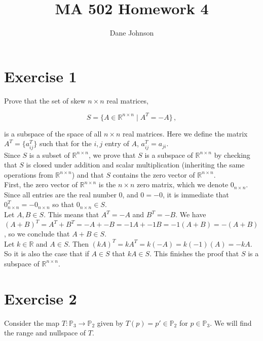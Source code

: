 \documentclass[11pt]{article}
\title{MA 502 Homework 4}
\author{Dane Johnson}
\begin{document}
\maketitle

\section*{Exercise 1}

Prove that the set of skew $n\times n$ real matrices,

$$S = \{A \in \mathbb{R}^{n\times n} \; | \; A^T = -A\} \, ,$$

is a subspace of the space of all $n \times n$ real matrices. Here we define the matrix $A^T = \{a_{ij}^T\}$ such that for the $i,j$ entry of $A$, $a_{ij}^T = a_{ji}$.\\

Since $S$ is a subset of $\mathbb{R}^{n\times n}$, we prove that $S$ is a subspace of $\mathbb{R}^{n\times n}$ by checking that $S$ is closed under addition and scalar multiplication (inheriting the same operations from $\mathbb{R}^{n\times n}$) and that $S$ contains the zero vector of $\mathbb{R}^{n \times n}$. \\

First, the zero vector of $\mathbb{R}^{n\times n}$ is the $n\times n$ zero matrix, which we denote $0_{n \times n}$. Since all entries are the real number 0, and $0 = -0$, it is immediate that $0_{n\times n}^T = -0_{n\times n}$ so that $0_{n\times n} \in S$.\\

Let $A,B \in S$. This means that $A^T = -A$ and $B^T = -B$. We have $(A+B)^T = A^T + B^T = -A + -B =-1A + -1B= -1(A+B) = -(A+B)$, so we conclude that $A+B \in S$. \\

Let $k \in \mathbb{R}$ and $A \in S$. Then $(kA)^T = kA^T = k(-A) = k(-1)(A) = -kA$. So it is also the case that if $A \in S$ that $kA \in S$. This finishes the proof that $S$ is a subspace of $\mathbb{R}^{n\times n}$.  

\section*{Exercise 2}

Consider the map $T : \mathbb{P}_3 \rightarrow \mathbb{P}_2$ given by $T(p) = p' \in \mathbb{P}_2$ for $p \in \mathbb{P}_3$. We will find the range and nullspace of $T$. \\
\end{document}
